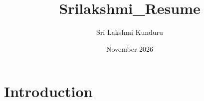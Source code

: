 \documentclass{article}
\title{Srilakshmi_Resume}
\author{Sri Lakshmi Kunduru}
\date{November 2026}
\begin{document}
\maketitle

\section{Introduction}
\end{document}
